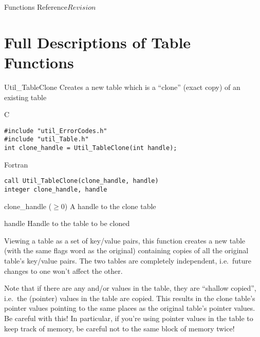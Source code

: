 \begin{cactuspart}{ Functions Reference}{}{$Revision$}

\chapter{Full Descriptions of Table Functions}


\begin{FunctionDescription}{Util\_TableClone}
\label{Util-TableClone}
Creates a new table which is a ``clone'' (exact copy) of an existing
table

\begin{SynopsisSection}
\begin{Synopsis}{C}
\begin{verbatim}
#include "util_ErrorCodes.h"
#include "util_Table.h"
int clone_handle = Util_TableClone(int handle);
\end{verbatim}
\end{Synopsis}
\begin{Synopsis}{Fortran}
\begin{verbatim}
call Util_TableClone(clone_handle, handle)
integer clone_handle, handle
\end{verbatim}
\end{Synopsis}
\end{SynopsisSection}

\begin{ResultSection}
\begin{Result}{clone\_handle ($\ge 0$)}
A handle to the clone table
\end{Result}
\end{ResultSection}

\begin{ParameterSection}
\begin{Parameter}{handle}
Handle to the table to be cloned
\end{Parameter}
\end{ParameterSection}

\begin{Discussion}
Viewing a table as a set of key/value pairs, this function creates
a new table (with the same flags word as the original) containing
copies of all the original table's key/value pairs.  The two tables
are completely independent, i.e.\ future changes to one won't affect
the other.

Note that if there are any  and/or 
values in the table, they are ``shallow copied'', i.e.\ the (pointer)
values in the table are copied.  This results in the clone table's
pointer values pointing to the same places as the original table's
pointer values.  Be careful with this!  In particular,
if you're using pointer values in the table to keep track of
 memory, be careful not to 
the same block of memory twice!


\end{Discussion}
\end{FunctionDescription}
\end{cactuspart}
